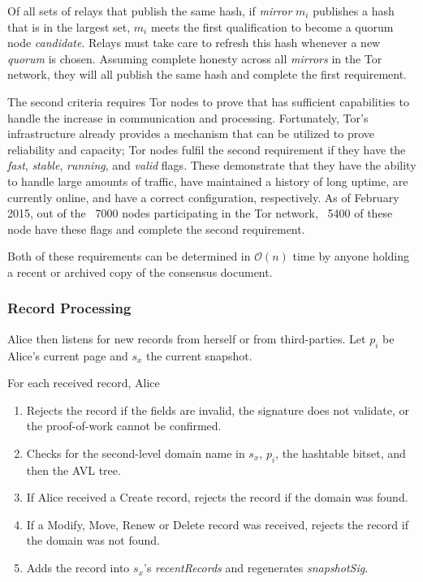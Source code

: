 Of all sets of relays that publish the same hash, if \emph{mirror} $ m_{i} $ publishes a hash that is in the largest set, $ m_{i} $ meets the first qualification to become a quorum node \emph{candidate}. Relays must take care to refresh this hash whenever a new \emph{quorum} is chosen. Assuming complete honesty across all \emph{mirrors} in the Tor network, they will all publish the same hash and complete the first requirement.

The second criteria requires Tor nodes to prove that has sufficient capabilities to handle the increase in communication and processing. Fortunately, Tor's infrastructure already provides a mechanism that can be utilized to prove reliability and capacity; Tor nodes fulfil the second requirement if they have the \emph{fast}, \emph{stable}, \emph{running}, and \emph{valid} flags. These demonstrate that they have the ability to handle large amounts of traffic, have maintained a history of long uptime, are currently online, and have a correct configuration, respectively. As of February 2015, out of the ~7000 nodes participating in the Tor network, ~5400 of these node have these flags and complete the second requirement.

Both of these requirements can be determined in $ \mathcal{O}(n) $ time by anyone holding a recent or archived copy of the consensus document.

\subsubsection{Record Processing}

Alice then listens for new records from herself or from third-parties. Let $ p_{i} $ be Alice's current page and $ s_{x} $ the current snapshot.

For each received record, Alice

\begin{enumerate}
	\item Rejects the record if the fields are invalid, the signature does not validate, or the proof-of-work cannot be confirmed.
	\item Checks for the second-level domain name in $ s_{x} $, $ p_{i} $, the hashtable bitset, and then the AVL tree.
	\item If Alice received a Create record, rejects the record if the domain was found.
	\item If a Modify, Move, Renew or Delete record was received, rejects the record if the domain was not found.
	\item Adds the record into $ s_{x} $'s \emph{recentRecords} and regenerates \emph{snapshotSig}.
\end{enumerate}

